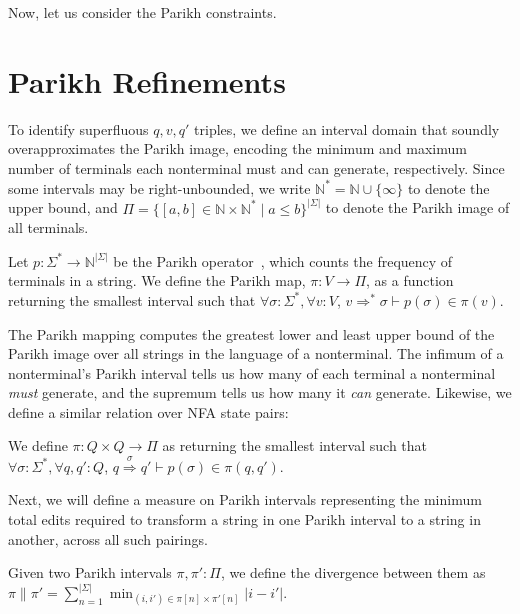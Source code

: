 Now, let us consider the Parikh constraints.

\section{Parikh Refinements}

To identify superfluous $q, v, q'$ triples, we define an interval domain that soundly overapproximates the Parikh image, encoding the minimum and maximum number of terminals each nonterminal must and can generate, respectively. Since some intervals may be right-unbounded, we write $\mathbb{N}^*=\mathbb{N} \cup \{\infty\}$ to denote the upper bound, and $\Pi = \{[a, b] \in \mathbb{N} \times \mathbb{N}^* \mid a \leq b\}^{|\Sigma|}$ to denote the Parikh image of all terminals.

\begin{definition}\label{def:parikh}
Let $p: \Sigma^*\rightarrow\mathbb{N}^{|\Sigma|}$ be the Parikh operator~\cite{parikh1966context}, which counts the frequency of terminals in a string. We define the Parikh map, $\pi: V \rightarrow \Pi$, as a function returning the smallest interval such that $\forall \sigma: \Sigma^*, \forall v: V$, $v \Rightarrow^* \sigma \vdash p(\sigma) \in \pi(v)$.
\end{definition}

The Parikh mapping computes the greatest lower and least upper bound of the Parikh image over all strings in the language of a nonterminal. The infimum of a nonterminal's Parikh interval tells us how many of each terminal a nonterminal \textit{must} generate, and the supremum tells us how many it \textit{can} generate. Likewise, we define a similar relation over NFA state pairs:

\begin{definition}
  We define $\pi: Q\times Q \rightarrow \Pi$ as returning the smallest interval such that $\forall \sigma: \Sigma^*, \forall q, q': Q$, $q \overset{\sigma}{\Longrightarrow} q' \vdash p(\sigma) \in \pi(q, q')$.
\end{definition}

Next, we will define a measure on Parikh intervals representing the minimum total edits required to transform a string in one Parikh interval to a string in another, across all such pairings.

\begin{definition}
  Given two Parikh intervals $\pi, \pi': \Pi$, we define the divergence between them as $\pi \parallel \pi' = \sum_{n=1}^{|\Sigma|} \min_{(i, i') \in \pi[n]\times \pi'[n]} |i - i'|$.
\end{definition}

